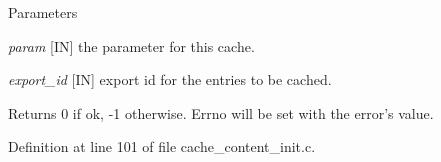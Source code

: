 \begin{DoxyParams}{Parameters}
\item[{\em param}][IN] the parameter for this cache. \item[{\em export\_\-id}][IN] export id for the entries to be cached.\end{DoxyParams}
\begin{DoxyReturn}{Returns}
0 if ok, -\/1 otherwise. Errno will be set with the error's value. 
\end{DoxyReturn}


Definition at line 101 of file cache\_\-content\_\-init.c.